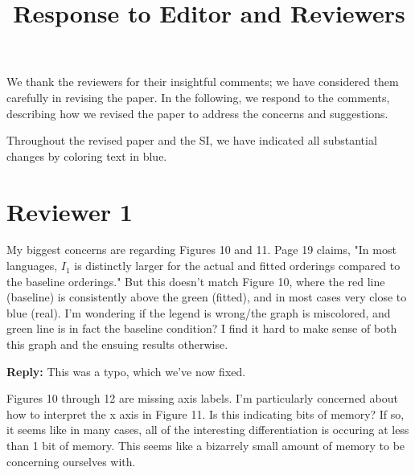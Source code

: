 \documentclass{article}[11pt,a4paper,oneside]
\title{Response to Editor and Reviewers}
\newenvironment{reply}
  {\par\medskip
   \color{blue}%
   \begin{framed}
   \textbf{Reply: }\ignorespaces}
 {\end{framed}
  \medskip}
\begin{document}
\maketitle

We thank the reviewers for their insightful comments; we have considered them carefully in revising the paper. In the following, we respond to the comments, describing how we revised the paper to address the concerns and suggestions.

Throughout the revised paper and the SI, we have indicated all substantial changes by coloring text in blue.

\section{Reviewer 1}

My biggest concerns are regarding Figures 10 and 11. Page 19 claims, "In most languages, $I_1$ is distinctly larger for the actual and fitted orderings compared to the baseline orderings." But this doesn't match Figure 10, where the red line (baseline) is consistently above the green (fitted), and in most cases very close to blue (real). I'm wondering if the legend is wrong/the graph is miscolored, and green line is in fact the baseline condition? I find it hard to make sense of both this graph and the ensuing results otherwise.

\begin{reply}
This was a typo, which we've now fixed.
\end{reply}

Figures 10 through 12 are missing axis labels. I'm particularly concerned about how to interpret the x axis in Figure 11. Is this indicating bits of memory? If so, it seems like in many cases, all of the interesting differentiation is occuring at less than 1 bit of memory. This seems like a bizarrely small amount of memory to be concerning ourselves with.
\end{document}
